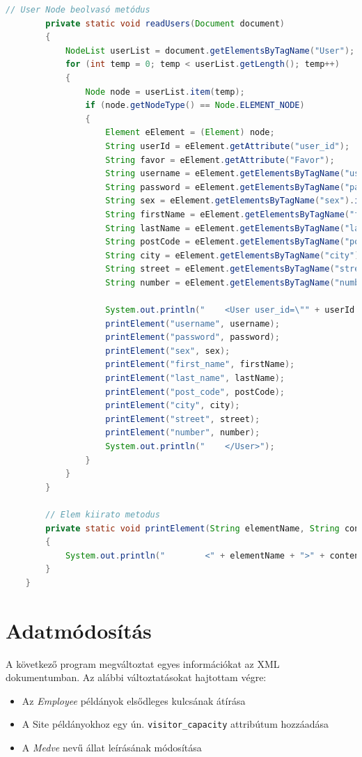 \documentclass[12pt]{report}
\begin{document}
\begin{lstlisting}[caption={DOMReadKLNSPG.java} olvasó program, language=Java]
		// User Node beolvasó metódus
		private static void readUsers(Document document)
		{
			NodeList userList = document.getElementsByTagName("User");
			for (int temp = 0; temp < userList.getLength(); temp++) 
			{
				Node node = userList.item(temp);
				if (node.getNodeType() == Node.ELEMENT_NODE) 
				{
					Element eElement = (Element) node;
					String userId = eElement.getAttribute("user_id");
					String favor = eElement.getAttribute("Favor");
					String username = eElement.getElementsByTagName("username").item(0).getTextContent();
					String password = eElement.getElementsByTagName("password").item(0).getTextContent();
					String sex = eElement.getElementsByTagName("sex").item(0).getTextContent();
					String firstName = eElement.getElementsByTagName("first_name").item(0).getTextContent();
					String lastName = eElement.getElementsByTagName("last_name").item(0).getTextContent();
					String postCode = eElement.getElementsByTagName("post_code").item(0).getTextContent();
					String city = eElement.getElementsByTagName("city").item(0).getTextContent();
					String street = eElement.getElementsByTagName("street").item(0).getTextContent();
					String number = eElement.getElementsByTagName("number").item(0).getTextContent();
					
					System.out.println("    <User user_id=\"" + userId + "\" Favor=\"" + favor + "\">");
					printElement("username", username);
					printElement("password", password);
					printElement("sex", sex);
					printElement("first_name", firstName);
					printElement("last_name", lastName);
					printElement("post_code", postCode);
					printElement("city", city);
					printElement("street", street);
					printElement("number", number);
					System.out.println("    </User>");
				}
			}
		}
		
		// Elem kiirato metodus
		private static void printElement(String elementName, String content)
		{
			System.out.println("        <" + elementName + ">" + content + "</" + elementName + ">");
		}
	}
\end{lstlisting}

\section{Adatmódosítás}
\indent\indent A következő program megváltoztat egyes információkat az XML dokumentumban. Az alábbi változtatásokat hajtottam végre:

\begin{itemize}
	\item Az \textit{Employee} példányok elsődleges kulcsának átírása
	\item A Site példányokhoz egy ún. \texttt{visitor\_capacity} attribútum hozzáadása
	\item A \textit{Medve} nevű állat leírásának módosítása
\end{itemize}
\end{document}
